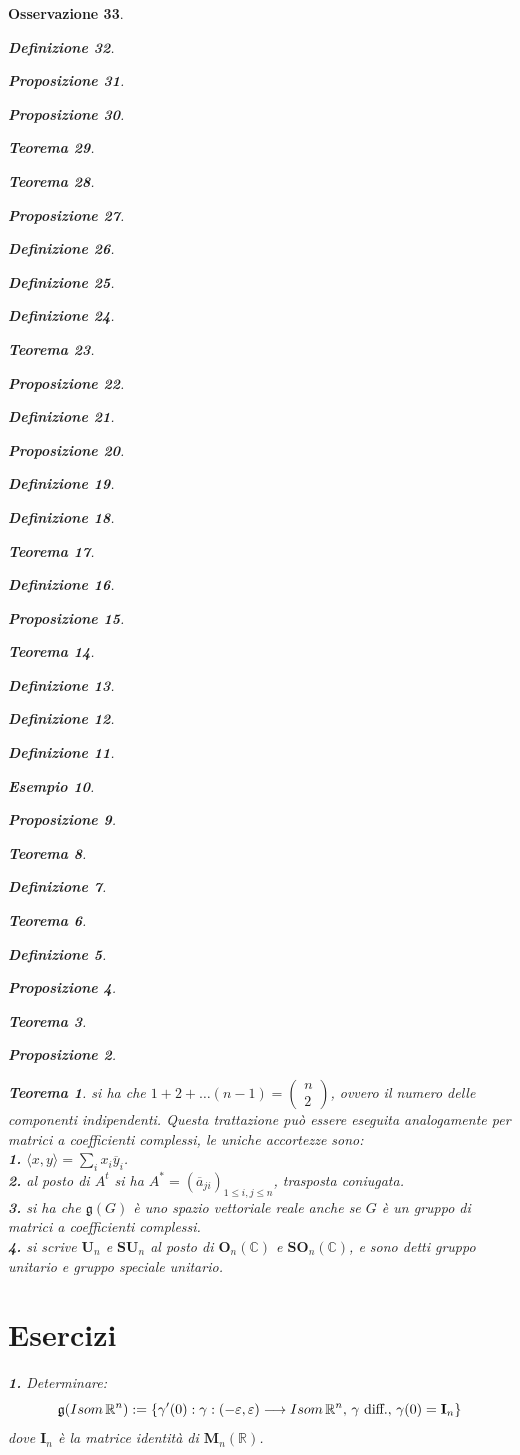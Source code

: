 \documentclass[oneside, 11pt]{amsbook}
\makeatletter
\newcommand{\0}{{(0)}}
\newcommand{\3}{{(3)}}
\theoremstyle{colonplain}
\newtheorem{thm}{Teorema}[chapter]
\newtheorem{prop}[thm]{Proposizione}
\theoremstyle{colondefinition}
\newtheorem{defn}[thm]{Definizione}
\newtheorem{ex}[thm]{Esempio}
\theoremstyle{colonremark}
\newtheorem{rmk}[thm]{Osservazione}
\numberwithin{equation}{chapter}
\renewcommand{\proofname}{Dimostrazione}
\renewenvironment{proof}[1][\proofname]{\par
  \pushQED{\end{proof}}%
  \normalfont \topsep6\p@\@plus6\p@\relax
  \trivlist
  \item[\hskip\labelsep\bfseries #1:]\ignorespaces
}{%
  \popQED\endtrivlist\@endpefalse
}
\makeatother
\begin{document}
\begin{rmk}
\begin{defn}
\begin{prop}
\begin{prop}
\begin{thm}
\begin{thm}
\begin{prop}
\begin{defn}
\begin{defn}
\begin{defn}
\begin{thm}
\begin{prop}
\begin{defn}
\begin{prop}
\begin{defn}
\begin{defn}
\begin{thm}
\begin{defn}
\begin{prop}
\begin{thm}
\begin{defn}
\begin{defn}
\begin{defn}
\begin{ex}
\begin{prop}
\begin{thm}
\begin{defn}
\begin{thm}
\begin{defn}
\begin{prop}
\begin{proof}
\begin{proof}
\begin{proof}
\begin{proof}
\begin{proof}[Soluzione]
\begin{proof}
\begin{proof}
\begin{thm}
\begin{prop}
\begin{thm}
\begin{proof} si ha che $1 + 2 + \dots (n - 1) = \begin{pmatrix}
    n \\
    2
\end{pmatrix}$, ovvero il numero delle componenti indipendenti. \end{proof}
Questa trattazione può essere eseguita analogamente per matrici a coefficienti complessi, le uniche accortezze sono: \\
\textbf{1.} $\langle x, y \rangle = \sum_i x_i \overline{y}_i$. \\
\textbf{2.} al posto di $A^t$ si ha $A^* = (\overline{a}_{ji})_{1 \leq i, j \leq n}$, trasposta coniugata. \\
\textbf{3.} si ha che $\mathfrak{g}(G)$ è uno spazio vettoriale reale anche se $G$ è un gruppo di matrici a coefficienti complessi. \\
\textbf{4.} si scrive $\mathbf{U}_n$ e $\mathbf{SU}_n$ al posto di $\mathbf{O}_n(\mathbb{C})$ e $\mathbf{SO}_n(\mathbb{C})$, e sono detti \textit{gruppo unitario} e \textit{gruppo speciale unitario}.

\section{Esercizi}
\textbf{1.} Determinare: 
\begin{equation}
    \mathfrak{g}(Isom\, \mathbb{R}^n) := \{ \gamma ' (0) : \gamma : (- \varepsilon, \varepsilon) \longrightarrow Isom\, \mathbb{R}^n, \, \gamma \text{ diff.}, \, \gamma(0) = \mathbf{I}_n \} \notag
\end{equation} 
dove $\mathbf{I}_n$ è la matrice identità di $\mathbf{M}_n(\mathbb{R})$. \\


\end{thm}
\end{prop}
\end{thm}
\end{proof}
\end{proof}
\end{proof}
\end{proof}
\end{proof}
\end{proof}
\end{proof}
\end{prop}
\end{defn}
\end{thm}
\end{defn}
\end{thm}
\end{prop}
\end{ex}
\end{defn}
\end{defn}
\end{defn}
\end{thm}
\end{prop}
\end{defn}
\end{thm}
\end{defn}
\end{defn}
\end{prop}
\end{defn}
\end{prop}
\end{thm}
\end{defn}
\end{defn}
\end{defn}
\end{prop}
\end{thm}
\end{thm}
\end{prop}
\end{prop}
\end{defn}
\end{rmk}
\end{document}
